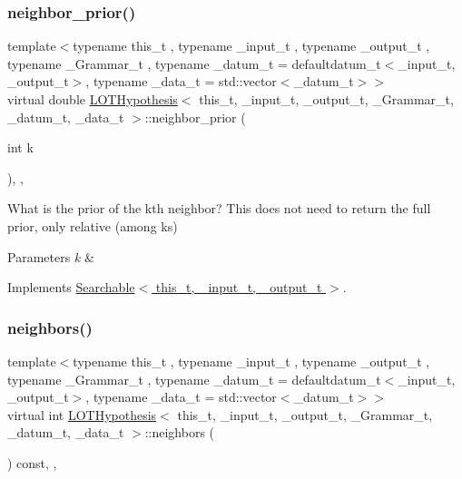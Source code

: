 \subsubsection{\texorpdfstring{neighbor\+\_\+prior()}{neighbor\_prior()}}
{\footnotesize\ttfamily template$<$typename this\+\_\+t , typename \+\_\+input\+\_\+t , typename \+\_\+output\+\_\+t , typename \+\_\+\+Grammar\+\_\+t , typename \+\_\+datum\+\_\+t  = defaultdatum\+\_\+t$<$\+\_\+input\+\_\+t, \+\_\+output\+\_\+t$>$, typename \+\_\+data\+\_\+t  = std\+::vector$<$\+\_\+datum\+\_\+t$>$$>$ \\
virtual double \hyperlink{class_l_o_t_hypothesis}{L\+O\+T\+Hypothesis}$<$ this\+\_\+t, \+\_\+input\+\_\+t, \+\_\+output\+\_\+t, \+\_\+\+Grammar\+\_\+t, \+\_\+datum\+\_\+t, \+\_\+data\+\_\+t $>$\+::neighbor\+\_\+prior (\begin{DoxyParamCaption}\item[{int}]{k }\end{DoxyParamCaption})\hspace{0.3cm}{\ttfamily [inline]}, {\ttfamily [override]}, {\ttfamily [virtual]}}



What is the prior of the k\textquotesingle{}th neighbor? This does not need to return the full prior, only relative (among ks) 


\begin{DoxyParams}{Parameters}
{\em k} & \\
\hline
\end{DoxyParams}


Implements \hyperlink{class_searchable_aa6f72073717a4df0d22c73705555b13a}{Searchable$<$ this\+\_\+t, \+\_\+input\+\_\+t, \+\_\+output\+\_\+t $>$}.

\mbox{\label{class_l_o_t_hypothesis_ac1fcba4457efaf7566ee6454c0785e74}} 
\subsubsection{\texorpdfstring{neighbors()}{neighbors()}}
{\footnotesize\ttfamily template$<$typename this\+\_\+t , typename \+\_\+input\+\_\+t , typename \+\_\+output\+\_\+t , typename \+\_\+\+Grammar\+\_\+t , typename \+\_\+datum\+\_\+t  = defaultdatum\+\_\+t$<$\+\_\+input\+\_\+t, \+\_\+output\+\_\+t$>$, typename \+\_\+data\+\_\+t  = std\+::vector$<$\+\_\+datum\+\_\+t$>$$>$ \\
virtual int \hyperlink{class_l_o_t_hypothesis}{L\+O\+T\+Hypothesis}$<$ this\+\_\+t, \+\_\+input\+\_\+t, \+\_\+output\+\_\+t, \+\_\+\+Grammar\+\_\+t, \+\_\+datum\+\_\+t, \+\_\+data\+\_\+t $>$\+::neighbors (\begin{DoxyParamCaption}{ }\end{DoxyParamCaption}) const\hspace{0.3cm}{\ttfamily [inline]}, {\ttfamily [override]}, {\ttfamily [virtual]}}



